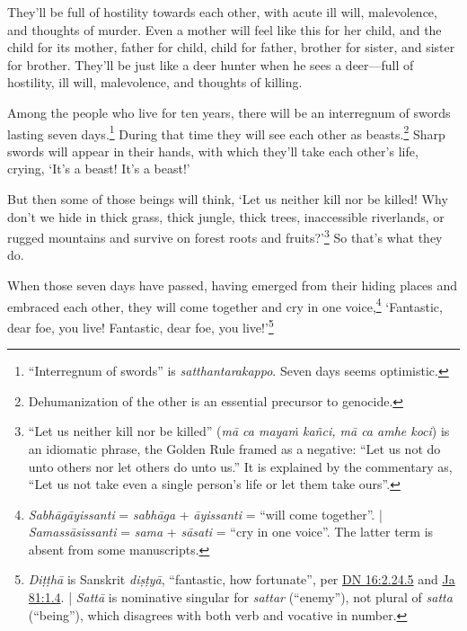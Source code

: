 \documentclass[12pt,openany]{book}%
\begin{document}
They’ll be full of hostility towards each other, with acute ill will, malevolence, and thoughts of murder. Even a mother will feel like this for her child, and the child for its mother, father for child, child for father, brother for sister, and sister for brother. They’ll be just like a deer hunter when he sees a deer—full of hostility, ill will, malevolence, and thoughts of killing. 

Among the people who live for ten years, there will be an interregnum of swords lasting seven days.\footnote{“Interregnum of swords” is \textit{satthantarakappo}. Seven days seems optimistic. } During that time they will see each other as beasts.\footnote{Dehumanization of the other is an essential precursor to genocide. } Sharp swords will appear in their hands, with which they’ll take each other’s life, crying, ‘It’s a beast! It’s a beast!’ 

But then some of those beings will think, ‘Let us neither kill nor be killed! Why don’t we hide in thick grass, thick jungle, thick trees, inaccessible riverlands, or rugged mountains and survive on forest roots and fruits?’\footnote{“Let us neither kill nor be killed” (\textit{\textsanskrit{mā} ca \textsanskrit{mayaṁ} \textsanskrit{kañci}, \textsanskrit{mā} ca amhe koci}) is an idiomatic phrase, the Golden Rule framed as a negative: “Let us not do unto others nor let others do unto us.” It is explained by the commentary as, “Let us not take even a single person’s life or let them take ours”. } So that’s what they do. 

When those seven days have passed, having emerged from their hiding places and embraced each other, they will come together and cry in one voice,\footnote{\textit{\textsanskrit{Sabhāgāyissanti}} = \textit{\textsanskrit{sabhāga}} + \textit{\textsanskrit{āyissanti}} = “will come together”. | \textit{\textsanskrit{Samassāsissanti}} = \textit{sama} + \textit{\textsanskrit{sāsati}} = “cry in one voice”. The latter term is absent from some manuscripts. } ‘Fantastic, dear foe, you live! Fantastic, dear foe, you live!’\footnote{\textit{\textsanskrit{Diṭṭhā}} is Sanskrit \textit{\textsanskrit{diṣṭyā}}, “fantastic, how fortunate”, per \href{https://suttacentral.net/dn16/en/sujato\#2.24.5}{DN 16:2.24.5} and \href{https://suttacentral.net/ja81/en/sujato\#1.4}{Ja 81:1.4}. | \textit{\textsanskrit{Sattā}} is nominative singular for \textit{sattar} (“enemy”), not plural of \textit{satta} (“being”), which disagrees with both verb and vocative in number. } 
\end{document}
